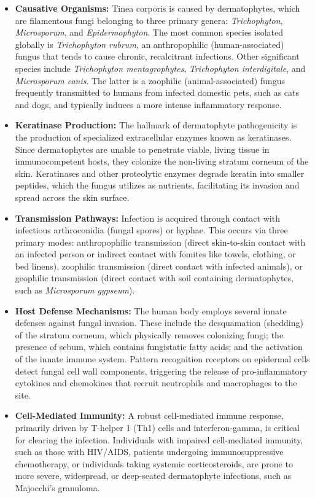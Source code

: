 \begin{itemize}
    \item \textbf{Causative Organisms:} Tinea corporis is caused by dermatophytes, which are filamentous fungi belonging to three primary genera: \textit{Trichophyton}, \textit{Microsporum}, and \textit{Epidermophyton}. The most common species isolated globally is \textit{Trichophyton rubrum}, an anthropophilic (human-associated) fungus that tends to cause chronic, recalcitrant infections. Other significant species include \textit{Trichophyton mentagrophytes}, \textit{Trichophyton interdigitale}, and \textit{Microsporum canis}. The latter is a zoophilic (animal-associated) fungus frequently transmitted to humans from infected domestic pets, such as cats and dogs, and typically induces a more intense inflammatory response.
    \item \textbf{Keratinase Production:} The hallmark of dermatophyte pathogenicity is the production of specialized extracellular enzymes known as keratinases. Since dermatophytes are unable to penetrate viable, living tissue in immunocompetent hosts, they colonize the non-living stratum corneum of the skin. Keratinases and other proteolytic enzymes degrade keratin into smaller peptides, which the fungus utilizes as nutrients, facilitating its invasion and spread across the skin surface.
    \item \textbf{Transmission Pathways:} Infection is acquired through contact with infectious arthroconidia (fungal spores) or hyphae. This occurs via three primary modes: anthropophilic transmission (direct skin-to-skin contact with an infected person or indirect contact with fomites like towels, clothing, or bed linens), zoophilic transmission (direct contact with infected animals), or geophilic transmission (direct contact with soil containing dermatophytes, such as \textit{Microsporum gypseum}).
    \item \textbf{Host Defense Mechanisms:} The human body employs several innate defenses against fungal invasion. These include the desquamation (shedding) of the stratum corneum, which physically removes colonizing fungi; the presence of sebum, which contains fungistatic fatty acids; and the activation of the innate immune system. Pattern recognition receptors on epidermal cells detect fungal cell wall components, triggering the release of pro-inflammatory cytokines and chemokines that recruit neutrophils and macrophages to the site.
    \item \textbf{Cell-Mediated Immunity:} A robust cell-mediated immune response, primarily driven by T-helper 1 (Th1) cells and interferon-gamma, is critical for clearing the infection. Individuals with impaired cell-mediated immunity, such as those with HIV/AIDS, patients undergoing immunosuppressive chemotherapy, or individuals taking systemic corticosteroids, are prone to more severe, widespread, or deep-seated dermatophyte infections, such as Majocchi's granuloma.

\end{itemize}
